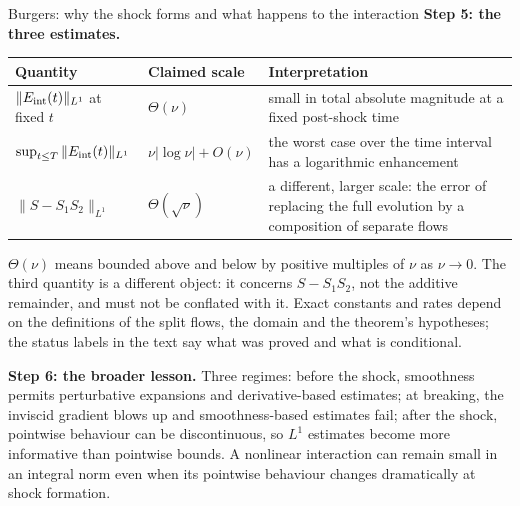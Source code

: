 \begin{explained}{Burgers: why the shock forms and what happens to the interaction}
\medskip\textbf{Step 5: the three estimates.}
\begin{center}\small
\begin{tabular}{@{}L{4.3cm}L{3.0cm}L{6.6cm}@{}}
\toprule
Quantity & Claimed scale & Interpretation\\\midrule
$\|E_{\mathrm{int}}(t)\|_{L^1}$ at fixed $t$ & $\Theta(\nu)$ & small in total absolute magnitude at a fixed post-shock time\\
$\sup_{t\le T}\|E_{\mathrm{int}}(t)\|_{L^1}$ & $\nu|\log\nu|+O(\nu)$ & the worst case over the time interval has a logarithmic enhancement\\
$\|S-S_1S_2\|_{L^1}$ & $\Theta(\sqrt\nu)$ & a different, larger scale: the error of replacing the full evolution by a composition of separate flows\\
\bottomrule
\end{tabular}
\end{center}
$\Theta(\nu)$ means bounded above and below by positive multiples of $\nu$ as $\nu\to0$. The third quantity is a different object: it concerns $S-S_1S_2$, not the additive remainder, and must not be conflated with it. Exact constants and rates depend on the definitions of the split flows, the domain and the theorem's hypotheses; the status labels in the text say what was proved and what is conditional.

\medskip\textbf{Step 6: the broader lesson.} Three regimes: before the shock, smoothness permits perturbative expansions and derivative-based estimates; at breaking, the inviscid gradient blows up and smoothness-based estimates fail; after the shock, pointwise behaviour can be discontinuous, so $L^1$ estimates become more informative than pointwise bounds. A nonlinear interaction can remain small in an integral norm even when its pointwise behaviour changes dramatically at shock formation.
\end{explained}

